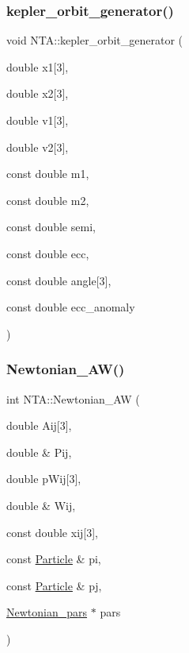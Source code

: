 \subsubsection{\texorpdfstring{kepler\+\_\+orbit\+\_\+generator()}{kepler\_orbit\_generator()}}
{\footnotesize\ttfamily void N\+T\+A\+::kepler\+\_\+orbit\+\_\+generator (\begin{DoxyParamCaption}\item[{double}]{x1\mbox{[}3\mbox{]},  }\item[{double}]{x2\mbox{[}3\mbox{]},  }\item[{double}]{v1\mbox{[}3\mbox{]},  }\item[{double}]{v2\mbox{[}3\mbox{]},  }\item[{const double}]{m1,  }\item[{const double}]{m2,  }\item[{const double}]{semi,  }\item[{const double}]{ecc,  }\item[{const double}]{angle\mbox{[}3\mbox{]},  }\item[{const double}]{ecc\+\_\+anomaly }\end{DoxyParamCaption})}

\hypertarget{namespaceNTA_aad37ae368f0a920088e180a73187685a}{}\label{namespaceNTA_aad37ae368f0a920088e180a73187685a} 
\subsubsection{\texorpdfstring{Newtonian\+\_\+\+A\+W()}{Newtonian\_AW()}}
{\footnotesize\ttfamily int N\+T\+A\+::\+Newtonian\+\_\+\+AW (\begin{DoxyParamCaption}\item[{double}]{Aij\mbox{[}3\mbox{]},  }\item[{double \&}]{Pij,  }\item[{double}]{p\+Wij\mbox{[}3\mbox{]},  }\item[{double \&}]{Wij,  }\item[{const double}]{xij\mbox{[}3\mbox{]},  }\item[{const \hyperlink{classParticle}{Particle} \&}]{pi,  }\item[{const \hyperlink{classParticle}{Particle} \&}]{pj,  }\item[{\hyperlink{classNTA_1_1Newtonian__pars}{Newtonian\+\_\+pars} $\ast$}]{pars }\end{DoxyParamCaption})}



